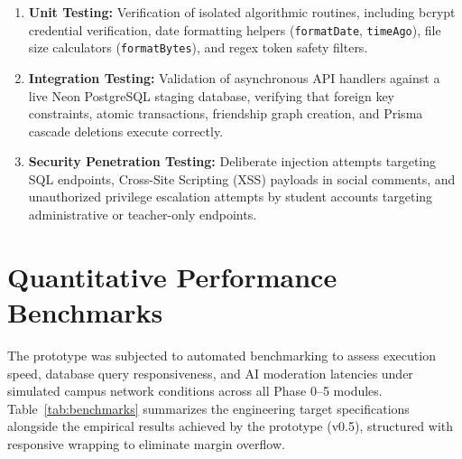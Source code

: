 \documentclass[11pt,a4paper]{report}
\begin{document}
\begin{enumerate}
    \item \textbf{Unit Testing:} Verification of isolated algorithmic routines, including bcrypt credential verification, date formatting helpers (\texttt{formatDate}, \texttt{timeAgo}), file size calculators (\texttt{formatBytes}), and regex token safety filters.
    \item \textbf{Integration Testing:} Validation of asynchronous API handlers against a live Neon PostgreSQL staging database, verifying that foreign key constraints, atomic transactions, friendship graph creation, and Prisma cascade deletions execute correctly.
    \item \textbf{Security Penetration Testing:} Deliberate injection attempts targeting SQL endpoints, Cross-Site Scripting (XSS) payloads in social comments, and unauthorized privilege escalation attempts by student accounts targeting administrative or teacher-only endpoints.
\end{enumerate}

\section{Quantitative Performance Benchmarks}

The prototype was subjected to automated benchmarking to assess execution speed, database query responsiveness, and AI moderation latencies under simulated campus network conditions across all Phase 0--5 modules. Table~\ref{tab:benchmarks} summarizes the engineering target specifications alongside the empirical results achieved by the prototype (v0.5), structured with responsive wrapping to eliminate margin overflow.
\end{document}
